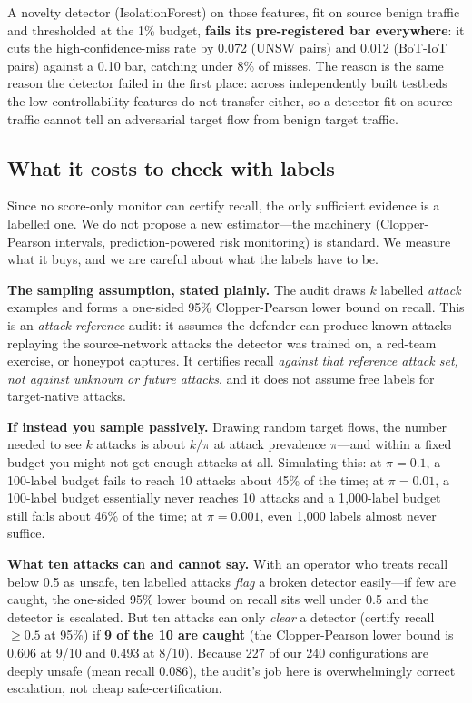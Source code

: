 \documentclass[11pt]{article}
\begin{document}
A novelty detector (IsolationForest) on those features, fit on source benign traffic and thresholded at the 1\% budget, \textbf{fails its pre-registered bar everywhere}: it cuts the high-confidence-miss rate by 0.072 (UNSW pairs) and 0.012 (BoT-IoT pairs) against a 0.10 bar, catching under 8\% of misses. The reason is the same reason the detector failed in the first place: across independently built testbeds the low-controllability features do not transfer either, so a detector fit on source traffic cannot tell an adversarial target flow from benign target traffic.

\subsection{What it costs to check with labels}
Since no score-only monitor can certify recall, the only sufficient evidence is a labelled one. We do not propose a new estimator---the machinery (Clopper-Pearson intervals, prediction-powered risk monitoring) is standard. We measure what it buys, and we are careful about what the labels have to be.

\textbf{The sampling assumption, stated plainly.} The audit draws $k$ labelled \emph{attack} examples and forms a one-sided 95\% Clopper-Pearson lower bound on recall. This is an \emph{attack-reference} audit: it assumes the defender can produce known attacks---replaying the source-network attacks the detector was trained on, a red-team exercise, or honeypot captures. It certifies recall \emph{against that reference attack set, not against unknown or future attacks}, and it does not assume free labels for target-native attacks.

\textbf{If instead you sample passively.} Drawing random target flows, the number needed to see $k$ attacks is about $k/\pi$ at attack prevalence $\pi$---and within a fixed budget you might not get enough attacks at all. Simulating this: at $\pi = 0.1$, a 100-label budget fails to reach 10 attacks about 45\% of the time; at $\pi = 0.01$, a 100-label budget essentially never reaches 10 attacks and a 1{,}000-label budget still fails about 46\% of the time; at $\pi = 0.001$, even 1{,}000 labels almost never suffice.

\textbf{What ten attacks can and cannot say.} With an operator who treats recall below 0.5 as unsafe, ten labelled attacks \emph{flag} a broken detector easily---if few are caught, the one-sided 95\% lower bound on recall sits well under 0.5 and the detector is escalated. But ten attacks can only \emph{clear} a detector (certify recall $\ge 0.5$ at 95\%) if \textbf{9 of the 10 are caught} (the Clopper-Pearson lower bound is 0.606 at 9/10 and 0.493 at 8/10). Because 227 of our 240 configurations are deeply unsafe (mean recall 0.086), the audit's job here is overwhelmingly correct escalation, not cheap safe-certification.
\end{document}
